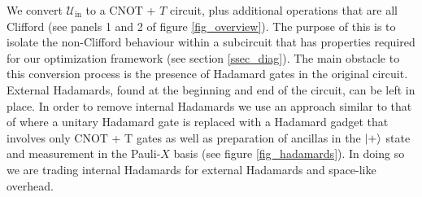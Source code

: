 \documentclass[notitlepage]{article}
\theoremstyle{definition}
\theoremstyle{problem}
\theoremstyle{lemma}
\begin{document}
We convert $\mathcal{U}_{\text{in}}$ to a CNOT + $T$ circuit, plus additional operations that are all Clifford (see panels 1 and 2 of figure \ref{fig_overview}). The purpose of this is to isolate the non-Clifford behaviour within a subcircuit that has properties required for our optimization framework (see section \ref{ssec_diag}). The main obstacle to this conversion process is the presence of Hadamard gates in the original circuit. External Hadamards, found at the beginning and end of the circuit, can be left in place. In order to remove internal Hadamards we use an approach similar to that of \cite{1_Montanaro_2017, 2_Bremner_2010} where a unitary Hadamard gate is replaced with a Hadamard gadget that involves only CNOT + T gates as well as preparation of ancillas in the $\left\vert{+}\right\rangle$ state and measurement in the Pauli-$X$ basis (see figure \ref{fig_hadamards}). In doing so we are trading internal Hadamards for external Hadamards and space-like overhead. \fi
\end{document}
